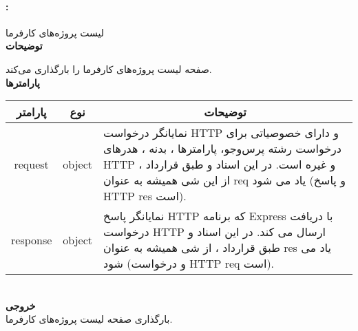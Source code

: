 \paragraph{:}
لیست پروژه‌های کارفرما
\\
\textbf{توضیحات}
\hr
\begin{flushleft}
	\framebox[.9\textwidth][l]{
		\lr{
			\textcolor{type}{void}
			\textcolor{func}{getProject}
			\textcolor{symb}{(}
			\textcolor{type}{object}
			\textcolor{arg}{request}
			\textcolor{symb}{,}
			\textcolor{type}{object}
			\textcolor{arg}{response}
			\textcolor{symb}{);}
		}
	}
\end{flushleft}
صفحه لیست پروژه‌های کارفرما را بارگذاری می‌کند.
\\
\textbf{پارامترها}
\hr \\[10pt]
\begin{tabular}{|m{4cm}|m{3cm}|m{10cm}|}
	\hline
	\multicolumn{1}{|c}{پارامتر}
	&
	\multicolumn{1}{|c}{نوع}
	&
	\multicolumn{1}{|c|}{توضیحات}
	\\
	\hline
	\multicolumn{1}{|c}{request}
	&
	\multicolumn{1}{|c|}{object}
	&
	نمایانگر درخواست HTTP و دارای خصوصیاتی برای درخواست رشته پرس‌و‌جو، پارامترها ، بدنه ، هدرهای HTTP و غیره است.
	در این اسناد و طبق قرارداد ، از این شی همیشه به عنوان req یاد می شود (و پاسخ HTTP res است).
	\\
	\hline
	\multicolumn{1}{|c}{response}
	&
	\multicolumn{1}{|c|}{object}
	&
	نمایانگر پاسخ HTTP که برنامه Express با دریافت درخواست HTTP ارسال می کند.
	در این اسناد و طبق قرارداد ، از شی همیشه به عنوان res یاد می شود (و درخواست HTTP req است).
	\\
	\hline
\end{tabular}
\\[10pt]
\textbf{خروجی}
\hr \\
بارگذاری صفحه لیست پروژه‌های کارفرما.

